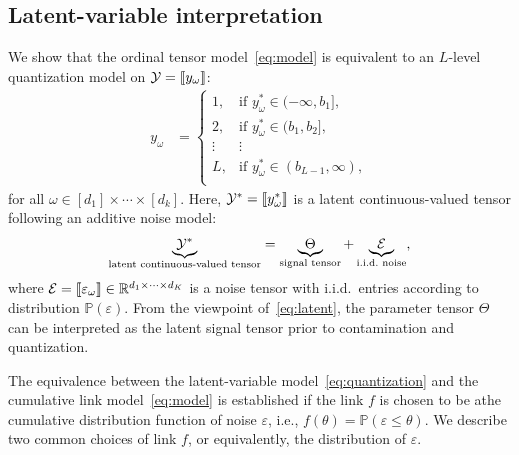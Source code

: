 \documentclass{article}
\theoremstyle{plain}
\theoremstyle{definition}
\newcommand*{\KeepStyleUnderBrace}[1]{%
  \mathop{%
    \mathchoice
    {\underbrace{\displaystyle#1}}%
    {\underbrace{\textstyle#1}}%
    {\underbrace{\scriptstyle#1}}%
    {\underbrace{\scriptscriptstyle#1}}%
  }\limits
}
\begin{document}
\subsection{Latent-variable interpretation}\label{sec:latent} 
We show that the ordinal tensor model~\eqref{eq:model} is equivalent to an $L$-level quantization model on $\mathcal{Y}=\llbracket y_\omega \rrbracket$:
\begin{align}\label{eq:quantization}
y_\omega&=
\begin{cases}
1,& \text{if $y^*_\omega\in(-\infty, b_1]$},\\
2,& \text{if $y^*_\omega\in(b_1, b_2]$},\\
\vdots  &\vdots\\
L,& \text{if $y^*_\omega\in(b_{L-1}, \infty)$},\\
\end{cases}
\end{align}
for all $\omega\in[d_1]\times \cdots \times [d_k]$. Here, $\mathcal{Y}^*=\llbracket y^*_\omega \rrbracket$ is a latent continuous-valued tensor following an additive noise model:
\begin{align}\label{eq:latent}
\KeepStyleUnderBrace{\tY^*}_{\text{latent continuous-valued tensor}}=\KeepStyleUnderBrace{\Theta}_{\text{signal tensor}}+\KeepStyleUnderBrace{\tE}_{\text{i.i.d.\ noise}},
\end{align}
where $\mathcal{E}=\llbracket \varepsilon_\omega \rrbracket\in\mathbb{R}^{d_1\times \cdots \times d_K}$ is a noise tensor with i.i.d.\ entries according to distribution $\mathbb{P}(\varepsilon)$. From the viewpoint of~\eqref{eq:latent}, the parameter tensor $\Theta$ can be interpreted as the latent signal tensor prior to contamination and quantization. 

The equivalence between the latent-variable model~\eqref{eq:quantization} and the cumulative link model~\eqref{eq:model} is established if the link $f$ is chosen to be athe cumulative distribution function of noise $\varepsilon$, i.e., $f(\theta)=\mathbb{P}(\varepsilon\leq \theta)$. We describe two common choices of link $f$, or equivalently, the distribution of $\varepsilon$. 
\end{document}
